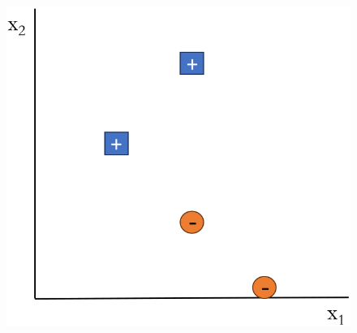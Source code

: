 \documentclass[
	number={2},
	title={Learning Linear Separators{,} SVMs and Kernels}
]{cs584notes}
\begin{document}
\begin{minipage}[m]{0.4\textwidth}
	\begin{figure}[H]
		\centering
		\includegraphics[width=\textwidth]{figures/2/perceptron_example}
		\caption{}
		\label{fig:perceptron_example}
	\end{figure}
\end{minipage}
\end{document}
